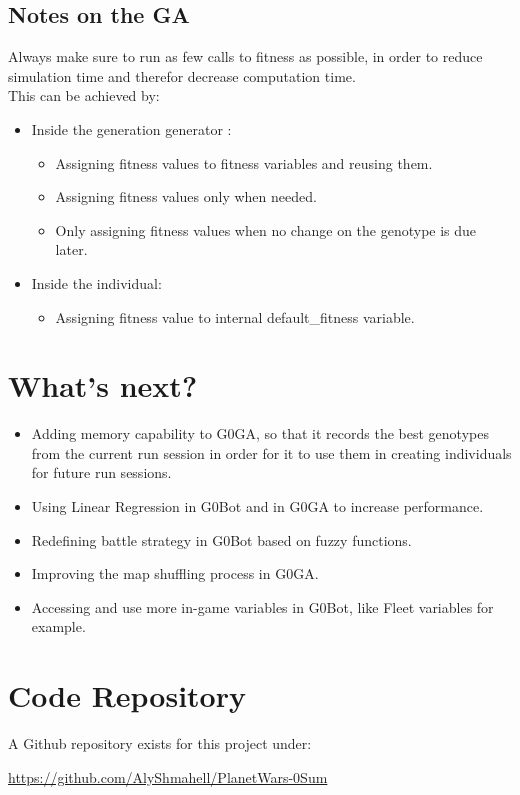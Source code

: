 \documentclass[12pt]{report}
\begin{document}
		\subsection{Notes on the GA}
		Always make sure to run as few calls to fitness as possible, in order to reduce simulation time and therefor decrease computation time.\\
		This can be achieved by:\\
			\begin{itemize}
				\item Inside the generation generator	: 
				\begin{itemize}
					\item Assigning fitness values to fitness variables and reusing them.
					\item Assigning fitness values only when needed.
					\item Only assigning fitness values when no change on the genotype is due later.
				\end{itemize}
				\item Inside the individual: 
				\begin{itemize}
					\item Assigning fitness value to internal default\_fitness variable.
				\end{itemize}
			\end{itemize}
	
	\newpage
	\section{What's next?}
	\begin{itemize}
		\item Adding memory capability to G0GA, so that it records the best genotypes from the current run session in order for it to use them in creating individuals for future run sessions.
		\item Using Linear Regression in G0Bot and in G0GA to increase performance.
		\item Redefining battle strategy in G0Bot based on fuzzy functions.
		\item Improving the map shuffling process in G0GA.
		\item Accessing and use more in-game variables in G0Bot, like Fleet variables for example.
	\end{itemize}
\newpage
\section{\textbf{Code Repository}}
A Github repository exists for this project under:\\
\begin{center}
	\url{https://github.com/AlyShmahell/PlanetWars-0Sum}
\end{center}
\end{document}
